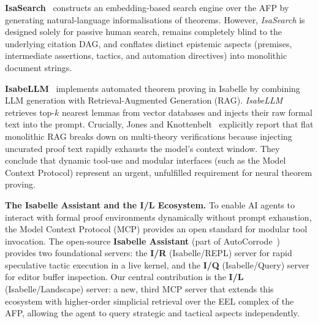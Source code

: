 \documentclass{svproc}
\begin{document}
\medskip\noindent\textbf{IsaSearch}~\cite{kadlez_isasearch_2026} constructs an embedding-based search engine over the AFP by generating natural-language informalisations of theorems. However, \emph{IsaSearch} is designed solely for passive human search, remains completely blind to the underlying citation DAG, and conflates distinct epistemic aspects (premises, intermediate assertions, tactics, and automation directives) into monolithic document strings.

\medskip\noindent\textbf{IsabeLLM}~\cite{jones_isabellm_2026} implements automated theorem proving in Isabelle by combining LLM generation with Retrieval-Augmented Generation (RAG). \emph{IsabeLLM} retrieves top-$k$ nearest lemmas from vector databases and injects their raw formal text into the prompt. Crucially, Jones and Knottenbelt~\cite{jones_isabellm_2026} explicitly report that flat monolithic RAG breaks down on multi-theory verifications because injecting uncurated proof text rapidly exhausts the model's context window. They conclude that dynamic tool-use and modular interfaces (such as the Model Context Protocol) represent an urgent, unfulfilled requirement for neural theorem proving.

\medskip\noindent\textbf{The Isabelle Assistant and the I/L Ecosystem.} To enable AI agents to interact with formal proof environments dynamically without prompt exhaustion, the Model Context Protocol (MCP) provides an open standard for modular tool invocation. The open-source \textbf{Isabelle Assistant} (part of AutoCorrode~\cite{AutoCorrode}) provides two foundational servers: the \textbf{I/R} (Isabelle/REPL) server for rapid speculative tactic execution in a live kernel, and the \textbf{I/Q} (Isabelle/Query) server for editor buffer inspection. Our central contribution is the \textbf{I/L} (Isabelle/\allowbreak Landscape) server: a new, third MCP server that extends this ecosystem with higher-order simplicial retrieval over the EEL complex of the AFP, allowing the agent to query strategic and tactical aspects independently.
\end{document}
